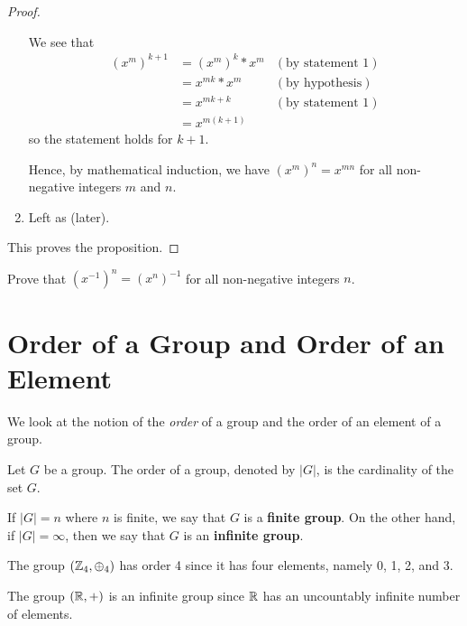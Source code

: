 \begin{proof}
\begin{enumerate}
        We see that
        \begin{align*}
            \left(x^m\right)^{k+1} &= \left(x^m\right)^k\ast x^m & (\text{by statement 1})\\
            &= x^{mk} \ast x^m & (\text{by hypothesis})\\
            &= x^{mk+k} & (\text{by statement 1})\\
            &= x^{m(k+1)}
        \end{align*}
        so the statement holds for $k+1$.

        Hence, by mathematical induction, we have $\left(x^m\right)^n = x^{mn}$ for all non-negative integers $m$ and $n$.

        \item Left as  (later).
    \end{enumerate}
    This proves the proposition.
\end{proof}
\begin{exercise}\label{exercise-swap-inverse-with-power}
    Prove that $(x^{-1})^n = (x^n)^{-1}$ for all non-negative integers $n$.
\end{exercise}

\section{Order of a Group and Order of an Element}
We look at the notion of the \textit{order} of a group and the order of an element of a group.

\begin{definition}
    Let $G$ be a group. The order of a group, denoted by $|G|$, is the cardinality of the set $G$.
\end{definition}

If $|G| = n$ where $n$ is finite, we say that $G$ is a \textbf{finite group}. On the other hand, if $|G| = \infty$, then we say that $G$ is an \textbf{infinite group}.

\begin{example}
    The group $(\mathbb{Z}_4, \oplus_4)$ has order 4 since it has four elements, namely 0, 1, 2, and 3.
\end{example}

\begin{example}
    The group $(\mathbb{R}, +)$ is an infinite group since $\mathbb{R}$ has an uncountably infinite number of elements.
\end{example}


